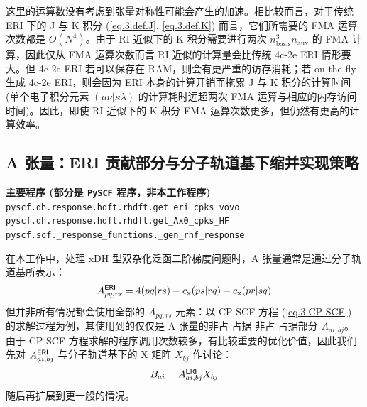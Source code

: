 这里的运算数没有考虑到张量对称性可能会产生的加速。相比较而言，对于传统 ERI 下的 J 与 K 积分 (\ref{eq.3.def.J}, \ref{eq.3.def.K}) 而言，它们所需要的 FMA 运算次数都是 $O(N^4)$。由于 RI 近似下的 K 积分需要进行两次 $n_\mathrm{basis}^3 n_\mathrm{aux}$ 的 FMA 计算，因此仅从 FMA 运算次数而言 RI 近似的计算量会比传统 4c-2e ERI 情形要大。但 4c-2e ERI 若可以保存在 RAM，则会有更严重的访存消耗；若 on-the-fly 生成 4c-2e ERI，则会因为 ERI 本身的计算开销而拖累 J 与 K 积分的计算时间 (单个电子积分元素 $(\mu \nu | \kappa \lambda)$ 的计算耗时远超两次 FMA 运算与相应的内存访问时间)。因此，即使 RI 近似下的 K 积分 FMA 运算次数更多，但仍然有更高的计算效率。

\subsection{A 张量：ERI 贡献部分与分子轨道基下缩并实现策略}
\label{sec.3.A-by-MO}

\begin{tcolorbox}
    \textbf{主要程序 (部分是 \texttt{PySCF} 程序，非本工作程序)}\\
    \verb|pyscf.dh.response.hdft.rhdft.get_eri_cpks_vovo|\\
    \verb|pyscf.dh.response.hdft.rhdft.get_Ax0_cpks_HF|\\
    \verb|pyscf.scf._response_functions._gen_rhf_response|
\end{tcolorbox}

在本工作中，处理 xDH 型双杂化泛函二阶梯度问题时，A 张量通常是通过分子轨道基所表示：
\begin{equation}
    \label{eq.3.A-tensor-RI-expansion}
    A_{pq, rs}^{\textsf{ERI}} = 4 (pq | rs) - c_\mathrm{x} (ps | rq) - c_\mathrm{x} (pr | sq)
\end{equation}
但并非所有情况都会使用全部的 $A_{pq, rs}$ 元素：以 CP-SCF 方程 (\ref{eq.3.CP-SCF}) 的求解过程为例，其使用到的仅仅是 A 张量的非占-占据-非占-占据部分 $A_{ai, bj}$。由于 CP-SCF 方程求解的程序调用次数较多，有比较重要的优化价值，因此我们先对 $A_{ai, bj}^{\textsf{ERI}}$ 与分子轨道基下的 X 矩阵 $X_{bj}$ 作讨论：
\begin{equation}
    \label{eq.3.A-contract-MO-directly}
    B_{ai} = A_{ai, bj}^{\textsf{ERI}} X_{bj}
\end{equation}
随后再扩展到更一般的情况。

